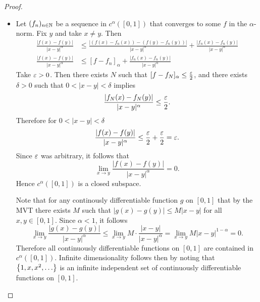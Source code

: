\documentclass[hw_all.tex]{subfiles}
\begin{document}
\begin{proof}
\begin{itemize}
        \item[$\alpha < 1)$]
            Let $(f_n)_{n \in \mathbb{N}}$ be a sequence in $c^\alpha([0,1])$ that converges to some $f$ in the $\alpha$-norm. Fix $y$ and take $x \neq y$. Then
            \begin{align*}
                \frac{|f(x) - f(y)|}{|x - y|^\alpha} &\leq \frac{|(f(x) - f_n(x)) - (f(y) - f_n(y))|}{|x-y|^\alpha} + \frac{|f_n(x) - f_n(y)|}{|x-y|^\alpha} \\
                \frac{|f(x) - f(y)|}{|x - y|^\alpha} &\leq [f-f_n]_{\alpha} + \frac{|f_n(x) - f_n(y)|}{|x-y|^\alpha}
            \end{align*}
            Take $\varepsilon > 0$. Then there exists $N$ such that $[f - f_N]_{\alpha} \leq \frac{\varepsilon}{2}$, and there exists $\delta > 0 $ such that $0 < |x-y| < \delta$ implies
            \[
                \frac{|f_N(x) - f_N(y)|}{|x-y|^\alpha} \leq \frac{\varepsilon}{2}
            .\]
            Therefore for $0 < |x-y| < \delta$
            \[
                \frac{|f(x) - f(y)|}{|x-y|^\alpha} \leq \frac{\varepsilon}{2} + \frac{\varepsilon}{2} = \varepsilon
            .\]
            Since $\varepsilon$ was arbitrary, it follows that
            \[
                \lim_{x \to y} \frac{|f(x) - f(y)|}{|x-y|^\alpha} = 0
            .\]
            Hence $c^\alpha([0,1])$ is a closed subspace.

            Note that for any continously differentiable function $g$ on $[0,1]$ that by the MVT there exists $M$ such that $|g(x) - g(y)| \leq M|x-y|$ for all $x,y \in [0,1]$. Since $\alpha < 1$, it follows
            \[
                \lim_{x\to y} \frac{|g(x) - g(y)|}{|x-y|^\alpha} \leq \lim_{x \to y} M \cdot \frac{|x-y|}{|x-y|^\alpha} = \lim_{x \to y} M |x-y|^{1 - \alpha} = 0
            .\]
            Therefore all continuously differentiable functions on $[0,1]$ are contained in $c^\alpha([0,1])$. Infinite dimensionality follows then by noting that $\qty{1, x, x^2, \ldots}$ is an infinite independent set of continuously differentiable functions on $[0,1]$.
    \end{itemize}
\end{proof}
\end{document}
